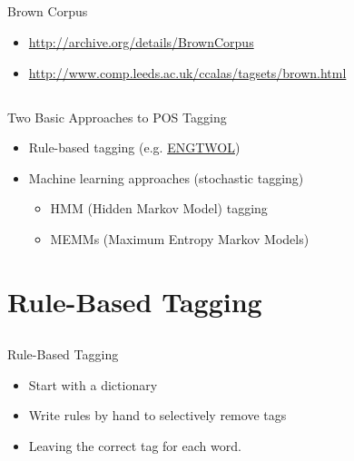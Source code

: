 \documentclass[9pt,xcolor=pdftex,dvipsnames,table]{beamer}
\begin{document}
\subsection{}
\begin{frame}{Brown Corpus}
	\begin{itemize}
		\item \url{http://archive.org/details/BrownCorpus}
		\item \url{http://www.comp.leeds.ac.uk/ccalas/tagsets/brown.html}
	\end{itemize}
\end{frame}

\subsection{}
\begin{frame}{Two Basic Approaches to POS Tagging}
	\begin{itemize}
		\item Rule-based tagging (e.g. \href{http://www2.lingsoft.fi/cgi-bin/engtwol}{ENGTWOL})
		\vspace{.25cm}
		\item Machine learning approaches (stochastic tagging)
			\begin{itemize}
				\item HMM (Hidden Markov Model) tagging
				\item MEMMs (Maximum Entropy Markov Models)
			\end{itemize}
	\end{itemize}
\end{frame}

\section{Rule-Based Tagging}

\subsection{}
\begin{frame}{Rule-Based Tagging}

	\begin{itemize}
		\item Start with a dictionary
		\item Write rules by hand to selectively remove tags
		\item Leaving the correct tag for each word.
	\end{itemize}
\end{frame}
\end{document}
